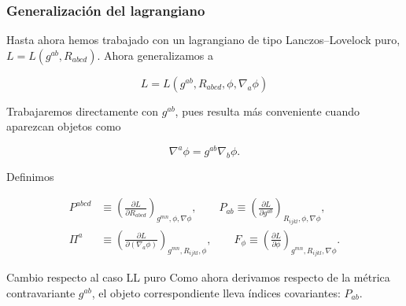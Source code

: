 \documentclass{beamer}
\newcommand{\CompactDisplaySpacing}{%
  \setlength{\abovedisplayskip}{2pt plus 1pt minus 1pt}%
  \setlength{\belowdisplayskip}{2pt plus 1pt minus 1pt}%
  \setlength{\abovedisplayshortskip}{0pt plus 1pt}%
  \setlength{\belowdisplayshortskip}{1pt plus 1pt}%
}
\begin{document}
\begin{frame}[label=nav-frame-072]

\frametitle{Generalización del lagrangiano}
\scriptsize
\linespread{.96}\selectfont\CompactDisplaySpacing

Hasta ahora hemos trabajado con un lagrangiano de tipo Lanczos--Lovelock puro, $L=L(g^{ab},R_{abcd})$. Ahora generalizamos a

\[
\boxed{
L=L(g^{ab},R_{abcd},\phi,\nabla_a\phi)
}
\]

Trabajaremos directamente con \(g^{ab}\), pues resulta más
conveniente cuando aparezcan objetos como

\[
\nabla^a\phi=g^{ab}\nabla_b\phi.
\]

Definimos

\begin{align}
P^{abcd}
&\equiv
\left(
\frac{\partial L}{\partial R_{abcd}}
\right)_{g^{mn},\phi,\nabla\phi}, \qquad
P_{ab}
\equiv
\left(
\frac{\partial L}{\partial g^{ab}}
\right)_{R_{ijkl},\phi,\nabla\phi},
\\[1mm]
\Pi^a
&\equiv
\left(
\frac{\partial L}{\partial(\nabla_a\phi)}
\right)_{g^{mn},R_{ijkl},\phi}, \qquad
F_\phi
\equiv
\left(
\frac{\partial L}{\partial\phi}
\right)_{g^{mn},R_{ijkl},\nabla\phi}.
\end{align}

\begin{block}{Cambio respecto al caso LL puro}
Como ahora derivamos respecto de la métrica contravariante
\(g^{ab}\), el objeto correspondiente lleva índices covariantes:
\(P_{ab}\).
\end{block}

\end{frame}
\end{document}
